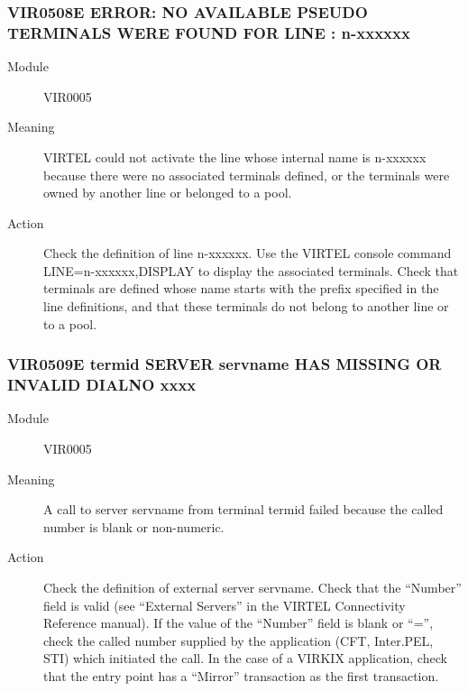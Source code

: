 \documentclass[letterpaper,10pt,english]{sphinxmanual}
\begin{document}
\subsubsection{VIR0508E ERROR: NO AVAILABLE PSEUDO TERMINALS WERE FOUND FOR LINE : n-xxxxxx}
\label{\detokenize{messages:vir0508e-error-no-available-pseudo-terminals-were-found-for-line-n-xxxxxx}}\begin{description}
\item[{Module}] \leavevmode
VIR0005

\item[{Meaning}] \leavevmode
VIRTEL could not activate the line whose internal name is n-xxxxxx because there were no associated terminals defined, or the terminals were owned by another line or belonged to a pool.

\item[{Action}] \leavevmode
Check the definition of line n-xxxxxx. Use the VIRTEL console command LINE=n-xxxxxx,DISPLAY to display the associated terminals. Check that terminals are defined whose name starts with the prefix specified in the line definitions, and that these terminals do not belong to another line or to a pool.

\end{description}


\subsubsection{VIR0509E termid SERVER servname HAS MISSING OR INVALID DIALNO xxxx}
\label{\detokenize{messages:vir0509e-termid-server-servname-has-missing-or-invalid-dialno-xxxx}}\begin{description}
\item[{Module}] \leavevmode
VIR0005

\item[{Meaning}] \leavevmode
A call to server servname from terminal termid failed because the called number is blank or non-numeric.

\item[{Action}] \leavevmode
Check the definition of external server servname. Check that the “Number” field is valid (see “External Servers” in the VIRTEL Connectivity Reference manual). If the value of the “Number” field is blank or “=”, check the called number supplied by the application (CFT, Inter.PEL, STI) which initiated the call. In the case of a VIRKIX application, check that the entry point has a “Mirror” transaction as the first transaction.

\end{description}
\end{document}
